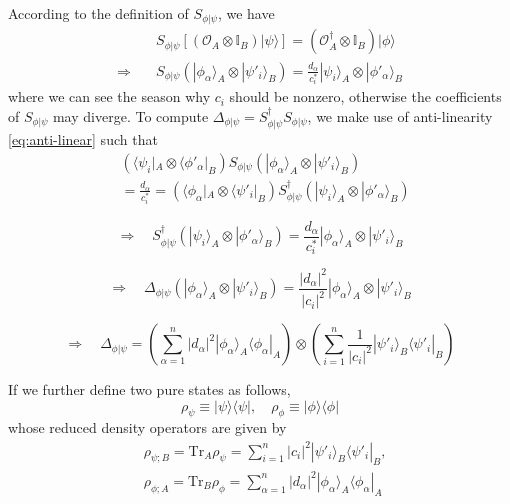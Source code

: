 \documentclass[a4paper,11pt]{article}
\newcommand{\ket}[1]{| #1 \rangle } %
\newcommand{\bra}[1]{\langle  #1 |} %
\renewcommand{\=}[1]{\stackrel{#1}{=}} %
\def\O{\mathcal{O}}
\def\Tr{\text{Tr}}
\begin{document}
According to the definition of $S_{\phi|\psi}$, we have
\begin{equation}
	\begin{aligned}
		&S_{\phi|\psi}\left[(\O_A \otimes \mathbb{I}_B)\ket{\psi}\right]=(\O_A^\dagger \otimes \mathbb{I}_B)\ket{\phi}\\
		\Rightarrow\quad &S_{\phi|\psi}\left(\ket{\phi_\alpha}_A\otimes\ket{\psi'_i}_B\right)=\frac{d_\alpha}{c_i^*}\ket{\psi_i}_A\otimes\ket{\phi'_\alpha}_B
	\end{aligned}
\end{equation}
where we can see the season why $c_i$ should be nonzero, otherwise the coefficients of $S_{\phi|\psi}$ may diverge. To compute $\Delta_{\phi|\psi}=S^\dagger_{\phi|\psi}S_{\phi|\psi}$, we make use of anti-linearity \eqref{eq:anti-linear} such that
\begin{equation}
	\begin{aligned}
		&\left(\bra{\psi_i}_A\otimes\bra{\phi'_\alpha}_B\right)S_{\phi|\psi}\left(\ket{\phi_\alpha}_A\otimes\ket{\psi'_i}_B\right)\\
		&=\frac{d_\alpha}{c_i^*}=\left(\bra{\phi_\alpha}_A\otimes\bra{\psi'_i}_B\right)S^\dagger_{\phi|\psi}\left(\ket{\psi_i}_A\otimes\ket{\phi'_\alpha}_B\right)
	\end{aligned}
\end{equation}

\begin{equation}
	\Rightarrow\quad S^\dagger_{\phi|\psi}\left(\ket{\psi_i}_A\otimes\ket{\phi'_\alpha}_B\right)=\frac{d_\alpha}{c_i^*}\ket{\phi_\alpha}_A\otimes\ket{\psi'_i}_B
\end{equation}

\begin{equation}
	\Rightarrow\quad\Delta_{\phi|\psi}\left(\ket{\phi_\alpha}_A\otimes\ket{\psi'_i}_B\right)=\frac{|d_\alpha|^2}{|c_i|^2}\ket{\phi_\alpha}_A\otimes\ket{\psi'_i}_B
\end{equation}

\begin{equation}
	\Rightarrow\quad\Delta_{\phi|\psi}=\left(\sum_{\alpha=1}^{n}|d_\alpha|^2\ket{\phi_\alpha}_A\bra{\phi_\alpha}_A\right)\otimes\left(\sum_{i=1}^{n}\frac{1}{|c_i|^2}\ket{\psi'_i}_B\bra{\psi'_i}_B\right)
\end{equation}






If we further define two pure states as follows,
\begin{equation}
	\rho_{\psi}\equiv \ket{\psi}\bra{\psi},\quad \rho_{\phi}\equiv \ket{\phi}\bra{\phi}
\end{equation}
whose reduced density operators are given by
\begin{equation}
	\begin{aligned}
		&\rho_{\psi;B}=\Tr_A\rho_{\psi}=\sum_{i=1}^{n}|c_i|^2\ket{\psi'_i}_B\bra{\psi'_i}_B,\\ &\rho_{\phi;A}=\Tr_B\rho_{\phi}=\sum_{\alpha=1}^{n}|d_\alpha|^2\ket{\phi_\alpha}_A\bra{\phi_\alpha}_A
	\end{aligned}
\end{equation}
\end{document}
